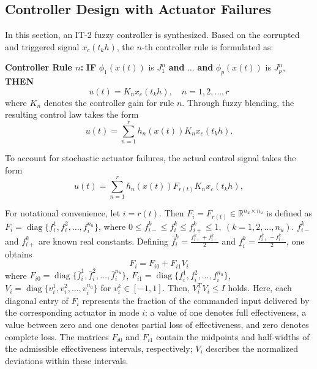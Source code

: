 \documentclass[preprint,review,fleqn,sort&compress,3p]{elsarticle}
\theoremstyle{definition} %
\theoremstyle{definition}%
\begin{document}
\subsection{Controller Design with Actuator Failures}
In this section, an IT-2 fuzzy controller is synthesized. Based on the corrupted and triggered signal $x_c(t_k h)$, the $n$-th controller rule is formulated as:

\textbf{Controller Rule $n$:} 
\textbf{IF} $\phi_1(x(t))$ is $J^{n}_1$ \textbf{and} $\dots$ \textbf{and} $\phi_p(x(t))$ is $J^{n}_p$, \textbf{THEN}
\begin{equation} 
	u(t) = K_{n} x_c(t_{k} h), \quad n = 1, 2, \ldots, r
\end{equation}
where $K_n$ denotes the controller gain for rule $n$. Through fuzzy blending, the resulting control law takes the form
\begin{equation} 
	u(t) = \sum_{n=1}^{r} h_n(x(t)) K_{n} x_c(t_k h).
\end{equation}

To account for stochastic actuator failures, the actual control signal takes the form
\begin{equation}\label{eq:local_controller}
	u(t) = \sum_{n=1}^{r} h_n(x(t)) F_{r(t)} K_{n} x_c(t_k h),
\end{equation}

For notational convenience, let $i = r(t)$. 
Then $F_i = F_{r(t)} \in \mathbb{R}^{n_u \times n_u}$ is defined as $F_i = \operatorname{diag}\{f_{i}^1, f_{i}^2, \ldots, f_{i}^{n_u}\}$, where $0 \le f_{i-}^{k} \le f_{i}^{k} \le f_{i+}^{k} \le 1,\ (k = 1,2,\ldots,n_u)$. $f_{i-}^{k}$ and $f_{i+}^{k}$ are known real constants. 
Defining $\bar{f}_{i}^{k} = \frac{f_{i+}^{k} + f_{i-}^{k}}{2}$ and $\underline{f}_{i}^{k} = \frac{f_{i+}^{k} - f_{i-}^{k}}{2}$, one obtains
\begin{equation}\label{F_i01}
	F_{i}= F_{i0}+F_{i1} V_{i}
\end{equation}
where $F_{i0} = \operatorname{diag}\{\bar{f}_{i}^{1}, \bar{f}_{i}^{2}, \ldots, \bar{f}_{i}^{n_u}\}$, $F_{i1} = \operatorname{diag}\{\underline{f}_{i}^{1}, \underline{f}_{i}^{2}, \ldots, \underline{f}_{i}^{n_u}\}$, $V_i = \operatorname{diag}\{v_{i}^{1}, v_{i}^{2}, \ldots, v_{i}^{n_u}\}$ for $v_i^k \in [-1,1]$. Then, $V_i^\mathrm{T}V_i \le I$ holds.
Here, each diagonal entry of $F_i$ represents the fraction of the commanded input delivered by the corresponding actuator in mode $i$: a value of one denotes full effectiveness, a value between zero and one denotes partial loss of effectiveness, and zero denotes complete loss. The matrices $F_{i0}$ and $F_{i1}$ contain the midpoints and half-widths of the admissible effectiveness intervals, respectively; $V_i$ describes the normalized deviations within these intervals.
\end{document}
